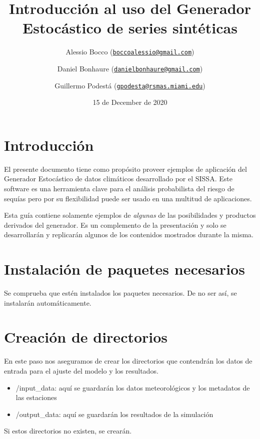 \documentclass[
]{article}
\title{Introducción al uso del Generador Estocástico de series sintéticas}
\author{Alessio Bocco (\href{mailto:boccoalessio@gmail.com}{\nolinkurl{boccoalessio@gmail.com}}) \and Daniel Bonhaure (\href{mailto:danielbonhaure@gmail.com}{\nolinkurl{danielbonhaure@gmail.com}}) \and Guillermo Podestá (\href{mailto:gpodesta@rsmas.miami.edu}{\nolinkurl{gpodesta@rsmas.miami.edu}})}
\date{15 de December de 2020}
\providecommand{\tightlist}{%
  \setlength{\itemsep}{0pt}\setlength{\parskip}{0pt}}
\begin{document}
\maketitle

{
\setcounter{tocdepth}{3}
\tableofcontents
}
\hypertarget{introducciuxf3n}{%
\section{Introducción}\label{introducciuxf3n}}

El presente documento tiene como propósito proveer ejemplos de aplicación del Generador Estocástico de datos climáticos desarrollado por el SISSA. Este software es una herramienta clave para el análisis probabilista del riesgo de sequías pero por su flexibilidad puede ser usado en una multitud de aplicaciones.

Esta guía contiene solamente ejemplos de \emph{algunas} de las posibilidades y productos derivados del generador. Es un complemento de la presentación y solo se desarrollarán y replicarán algunos de los contenidos mostrados durante la misma.

\hypertarget{instalaciuxf3n-de-paquetes-necesarios}{%
\section{Instalación de paquetes necesarios}\label{instalaciuxf3n-de-paquetes-necesarios}}

Se comprueba que estén instalados los paquetes necesarios. De no ser así,
se instalarán automáticamente.

\hypertarget{creaciuxf3n-de-directorios}{%
\section{Creación de directorios}\label{creaciuxf3n-de-directorios}}

En este paso nos aseguramos de crear los directorios que contendrán los datos
de entrada para el ajuste del modelo y los resultados.

\begin{itemize}
\tightlist
\item
  /input\_data: aquí se guardarán los datos meteorológicos y los metadatos de las estaciones
\item
  /output\_data: aquí se guardarán los resultados de la simulación
\end{itemize}

Si estos directorios no existen, se crearán.
\end{document}
